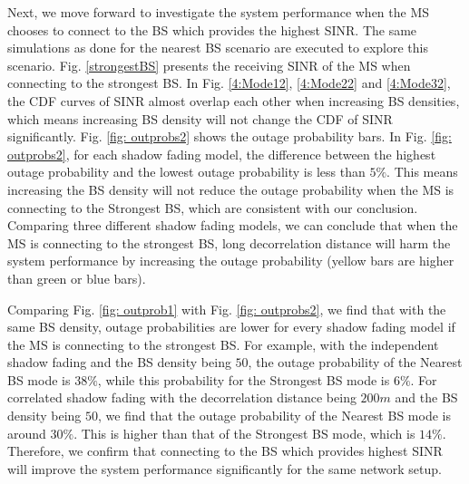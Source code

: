 \documentclass[journal,10pt]{IEEEtran}
\begin{document}
 \par Next, we move forward to investigate the system performance when the MS chooses to connect to the BS which provides the highest SINR. The same simulations as done for the nearest BS scenario are executed to explore this scenario. Fig. \ref{strongestBS} presents the receiving SINR of the MS when connecting to the strongest BS. In Fig. \ref{4:Mode12}, \ref{4:Mode22} and \ref{4:Mode32}, the CDF curves of SINR almost overlap each other when increasing BS densities, which means increasing BS density will not change the CDF of SINR significantly. Fig. \ref{fig: outprobs2} shows the outage probability bars. In Fig. \ref{fig: outprobs2}, for each shadow fading model, the difference between the highest outage probability and the lowest outage probability is less than $5\%$. This means increasing the BS density will not reduce the outage probability when the MS is connecting to the Strongest BS, which are consistent with our conclusion. Comparing three different shadow fading models, we can conclude that when the MS is connecting to the strongest BS, long decorrelation distance will harm the system performance by increasing the outage probability (yellow bars are higher than green or blue bars). 
 \par Comparing Fig. \ref{fig: outprob1} with Fig. \ref{fig: outprobs2}, we find that with the same BS density, outage probabilities are lower for every shadow fading model if the MS is connecting to the strongest BS. For example, with the independent shadow fading and the BS density being $50$, the outage probability of the Nearest BS mode is $38\%$, while this probability for the Strongest BS mode is $6\%$. For correlated shadow fading with the decorrelation distance being $200m$ and the BS density being $50$, we find that the outage probability of the Nearest BS mode is around $30\%$. This is higher than that of the Strongest BS mode, which is $14\%$. Therefore, we confirm that connecting to the BS which provides highest SINR will improve the system performance significantly for the same network setup. 
\end{document}
